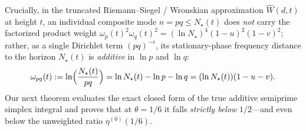 \documentclass[11pt,reqno]{amsart}
\theoremstyle{definition}
\theoremstyle{remark}
\numberwithin{equation}{section}
\begin{document}
Crucially, in the truncated Riemann--Siegel / Wronskian approximation $\widehat{W}(d,t)$ at height $t$, an individual composite mode $n = pq \le N_\star(t)$ does \emph{not} carry the factorized product weight $\omega_p(t)^2\omega_q(t)^2 = (\ln N_\star)^4(1-u)^2(1-v)^2$; rather, as a single Dirichlet term $(pq)^{-s}$, its stationary-phase frequency distance to the horizon $N_\star(t)$ is \emph{additive} in $\ln p$ and $\ln q$:
\begin{equation}\label{eq:true-additive-weight}
\omega_{pq}(t) := \ln\Bigl(\frac{N_\star(t)}{pq}\Bigr) = \ln N_\star(t) - \ln p - \ln q = (\ln N_\star(t))(1 - u - v).
\end{equation}
Our next theorem evaluates the exact closed form of the true additive semiprime simplex integral and proves that at $\theta = 1/6$ it falls \emph{strictly below} $1/2$---and even below the unweighted ratio $\eta^{(0)}(1/6)$.
\end{document}
